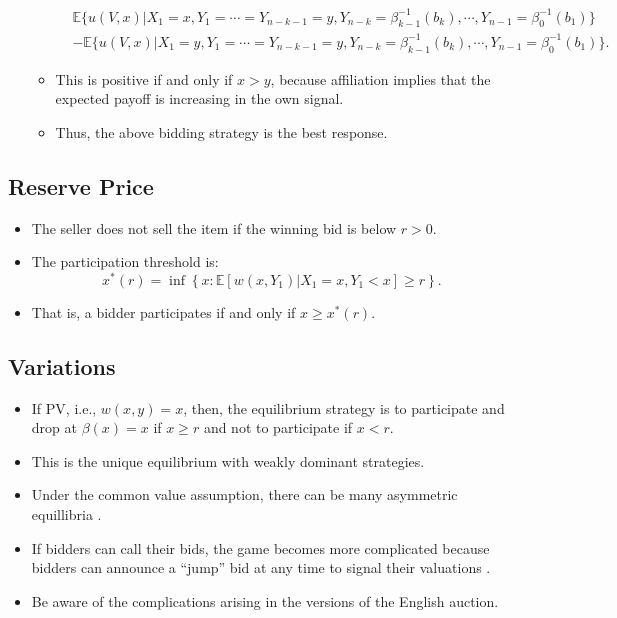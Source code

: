\documentclass[]{book}
\providecommand{\tightlist}{%
  \setlength{\itemsep}{0pt}\setlength{\parskip}{0pt}}
\begin{document}
\begin{itemize}
\begin{itemize}
    \begin{equation}
    \begin{split}
    &\mathbb{E}\{u(V, x)| X_1 = x, Y_1 = \cdots = Y_{n - k - 1} = y, Y_{n - k} = \beta_{k - 1}^{-1}(b_k), \cdots, Y_{n - 1} = \beta_0^{-1}(b_1)\}\\
    &- \mathbb{E}\{u(V, x)| X_1 = y, Y_1 = \cdots = Y_{n - k - 1} = y, Y_{n - k} = \beta_{k - 1}^{-1}(b_k), \cdots, Y_{n - 1} = \beta_0^{-1}(b_1)\}.
    \end{split}
    \end{equation}
  \item
    This is positive if and only if \(x > y\), because affiliation
    implies that the expected payoff is increasing in the own signal.
  \item
    Thus, the above bidding strategy is the best response.
  \end{itemize}
\end{itemize}

\subsection{Reserve Price}\label{reserve-price}

\begin{itemize}
\tightlist
\item
  The seller does not sell the item if the winning bid is below
  \(r > 0\).
\item
  The participation threshold is: \[
  x^*(r) = \inf\left\{x: \mathbb{E}[w(x, Y_1)| X_1 = x, Y_1 < x] \ge r\right\}.
  \]
\item
  That is, a bidder participates if and only if \(x \ge x^*(r)\).
\end{itemize}

\subsection{Variations}\label{variations}

\begin{itemize}
\tightlist
\item
  If PV, i.e., \(w(x, y) = x\), then, the equilibrium strategy is to
  participate and drop at \(\beta(x) = x\) if \(x \ge r\) and not to
  participate if \(x < r\).
\item
  This is the unique equilibrium with weakly dominant strategies.
\item
  Under the common value assumption, there can be many asymmetric
  equillibria
  \citep{milgromRationalExpectationsInformation1981, bikhchandaniEquilibriaOpenCommon1991}.
\item
  If bidders can call their bids, the game becomes more complicated
  because bidders can announce a ``jump'' bid at any time to signal
  their valuations \citep{averyStrategicJumpBidding1998}.
\item
  Be aware of the complications arising in the versions of the English
  auction.
\end{itemize}
\end{document}
